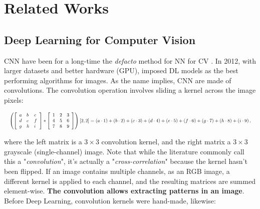 \chapter{Related Works}
\label{chapter:related}

{}


\section{Deep Learning for Computer Vision}

\acf{CNN} have been for a long-time the \textit{defacto} method for \acs{NN} for \ac{CV}
\citep{fukushima1980neocognitron,lecun1999lenet}. In 2012, with larger datasets and better hardware
(\ie \acs{GPU}), \cite{krizhevsky2012alexnet} imposed \ac{DL} models as the best performing
algorithms for images. As the name implies, \acs{CNN} are made of convolutions. The convolution
operation involves sliding a kernel across the image pixels:

\begin{equation}
    \resizebox{\hsize}{!}{$
      \left(\left[\begin{array}{lll}
                  a & b & c \\
                  d & e & f \\
                  g & h & i
            \end{array}\right] *\left[\begin{array}{lll}
                  1 & 2 & 3 \\
                  4 & 5 & 6 \\
                  7 & 8 & 9
            \end{array}\right]\right)[2,2]=(a \cdot 1)+(b \cdot 2)+(c \cdot 3)+(d \cdot 4)+(e \cdot 5)+(f \cdot 6)+(g \cdot 7)+(h \cdot 8)+(i \cdot 9)\,,
        $}
      \label{eq:related_conv}
\end{equation}

\noindent where the left matrix is a $3\times 3$ convolution kernel, and the right matrix a $3
      \times 3$ grayscale (\ie single-channel) image. Note that while the literature commonly call
this a "\textit{convolution}", it's actually a "\textit{cross-correlation}" because the kernel
hasn't been flipped. If an image contains multiple channels, as an RGB image, a different kernel
is applied to each channel, and the resulting matrices are summed element-wise. \textbf{The
      convolution allows extracting patterns in an image}. Before Deep Learning, convolution kernels
were hand-made, likewise:

